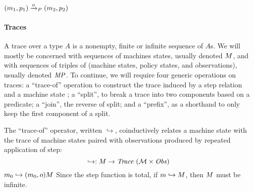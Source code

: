 \documentclass[acmsmall,review,anonymous]{acmart}\settopmatter{printfolios=true,printccs=false,printacmref=false}
\begin{document}
            {\((m_1,p_1) \xrightarrow{o}_P (m_2,p_2)\)}



\paragraph{Traces}

A trace over a type $A$ is a nonempty, finite or infinite
sequence of $A$s. We will mostly be concerned with sequences of
machines states, usually denoted $M$, and with sequences of
triples of (machine states, policy states, and observations), usually
denoted $\mathit{MP}$.
To continue, we will require four generic operations
on traces: a ``trace-of'' operation to construct the
trace induced by a step relation and a machine state
;
a ``split'', to break a
trace into two components based on a predicate; a ``join'', the
reverse of split; and a ``prefix'', as a shorthand to only keep the
first component of a split.  

The ``trace-of'' operator, written \(\hookrightarrow\), coinductively
relates a machine state with the trace of machine states paired with
observations produced by repeated application of step:  
%
\[\hookrightarrow : M \rightarrow \mathit{Trace}~({\mathcal M} \times \mathit{Obs})\]%
%
            {\(m_0 \hookrightarrow (m_0,o) M\)}%
%
\noindent
Since the step function is total, if \(m \hookrightarrow M\),
then \(M\) must be infinite.

\end{document}
